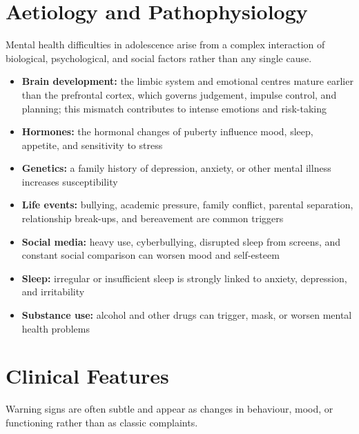 \section*{Aetiology and Pathophysiology}
Mental health difficulties in adolescence arise from a complex interaction of biological, psychological, and social factors rather than any single cause.

\begin{itemize}
    \item \textbf{Brain development:} the limbic system and emotional centres mature earlier than the prefrontal cortex, which governs judgement, impulse control, and planning; this mismatch contributes to intense emotions and risk-taking
    \item \textbf{Hormones:} the hormonal changes of puberty influence mood, sleep, appetite, and sensitivity to stress
    \item \textbf{Genetics:} a family history of depression, anxiety, or other mental illness increases susceptibility
    \item \textbf{Life events:} bullying, academic pressure, family conflict, parental separation, relationship break-ups, and bereavement are common triggers
    \item \textbf{Social media:} heavy use, cyberbullying, disrupted sleep from screens, and constant social comparison can worsen mood and self-esteem
    \item \textbf{Sleep:} irregular or insufficient sleep is strongly linked to anxiety, depression, and irritability
    \item \textbf{Substance use:} alcohol and other drugs can trigger, mask, or worsen mental health problems
\end{itemize}

\section*{Clinical Features}
Warning signs are often subtle and appear as changes in behaviour, mood, or functioning rather than as classic complaints.

